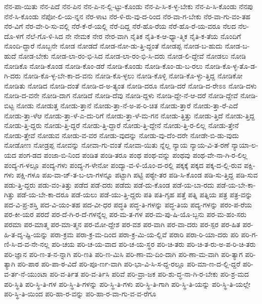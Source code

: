 {ನೆನ-ಪಾ-ಯಿತು
ನೆನ-ಪಿದೆ
ನೆನ-ಪಿನ
ನೆನ-ಪಿ-ನ-ಲ್ಲಿ-ಟ್ಟು-ಕೊಂಡು
ನೆನ-ಪಿ-ಸಿ-ಕ-ಳ್ಳ-ಬೇಕು
ನೆನ-ಪಿ-ಸಿ-ಕೊಂಡು
ನೆನಪು
ನೆನೆ-ಸಿ-ಕೊಂಡು
ನೆಪೋ-ಲಿ-ಯ-ನ್ನನ
ನೆರ-ಳಾಟ
ನೆರ-ಳಿ-ರು-ವು-ದ-ರಿಂದ
ನೆರ-ವಾ-ಗ-ಬೇಕು
ನೆರ-ವಾ-ಗು-ವಂ-ತಹ
ನೆರ-ವಿಗೆ
ನೆರ-ವೇ-ರಿ-ಸು-ವಲ್ಲಿ
ನೆರೆ-ಕೆ-ರೆ-ಯಲ್ಲಿ
ನೆರೆ-ದಿದ್ದ
ನೆರೆ-ಹೊ-ರೆಯ
ನೆರೆ-ಹೊ-ರೆ-ಯ-ವರೂ
ನೆಲದ
ನೆಲ-ದೊ-ಳಗೆ
ನೆಲೆ-ಗೊ-ಳಿ-ಸಿದ
ನೇ
ನೇಮಕ
ನೇರ
ನೇರ-ವಾಗಿ
ನೈತಿಕ
ನೈತಿ-ಕ-ಆ-ಧ್ಯಾ-ತ್ಮಿಕ
ನೈತಿ-ಕ-ತೆಯ
ನೊಂದಿಗೆ
ನೊಂದಿ-ದ್ದಾರೆ
ನೊಬ್ಬನೇ
ನೋಡ
ನೋಡದೆ
ನೋಡ-ನೋ-ಡು-ತ್ತಿ-ದ್ದಂತೆ
ನೋಡಪ್ಪ
ನೋಡ-ಬ-ಹುದು
ನೋಡ-ಬ-ಹುದೆ
ನೋಡ-ಬೇಕು
ನೋಡ-ಲಾ-ರಂ-ಭಿ-ಸಿದ
ನೋಡ-ಲಾ-ರಂ-ಭಿ-ಸಿ-ದರು
ನೋಡ-ಲಿ-ದ್ದೇವೆ
ನೋಡಲು
ನೋಡಿ
ನೋಡಿಕೊ
ನೋಡಿ-ಕೊಂಡ
ನೋಡಿ-ಕೊಂ-ಡರೆ
ನೋಡಿ-ಕೊಂಡು
ನೋಡಿ-ಕೊಂ-ಡು-ಬ-ರಲು
ನೋಡಿ-ಕೊ-ಳ್ಳ-ತೊ-ಡ-ಗಿ-ದರು
ನೋಡಿ-ಕೊ-ಳ್ಳ-ಬೇ-ಕಾ-ದ-ವನು
ನೋಡಿ-ಕೊ-ಳ್ಳಲು
ನೋಡಿ-ಕೊಳ್ಳಿ
ನೋಡಿ-ಕೊ-ಳ್ಳು-ತ್ತಿದ್ದ
ನೋಡಿಕೋ
ನೋಡಿತು
ನೋಡಿದ
ನೋಡಿ-ದಂತೆ
ನೋಡಿ-ದ-ಅ-ತ್ಯಂತ
ನೋಡಿ-ದರೂ
ನೋಡಿ-ದರೆ
ನೋಡಿ-ದ-ರೇಽಽ
ನೋಡಿ-ದಳು
ನೋಡಿ-ದ-ವನೇ
ನೋಡಿ-ದಾಗ
ನೋಡಿದೆ
ನೋಡಿ-ದೆವು
ನೋಡಿ-ದ್ದಳು
ನೋಡಿ-ದ್ದೇ-ನೆ-ಆ-ದರೆ
ನೋಡಿ-ದ್ದೇವೆ
ನೋಡಿ-ಬಿಟ್ಟ
ನೋಡು
ನೋಡುತ್ತ
ನೋಡು-ತ್ತಾನೆ
ನೋಡು-ತ್ತಾ-ನೆ-ಅ-ಪ-ರಿ-ಚಿತ
ನೋಡು-ತ್ತಾರೆ
ನೋಡು-ತ್ತಾ-ರೆ-ಎದೆ
ನೋಡು-ತ್ತಾ-ಳೆಆ
ನೋಡು-ತ್ತಾ-ಳೆ-ಎ-ದು-ರಿಗೆ
ನೋಡು-ತ್ತಾ-ಳೆ-ಮ-ಗನ
ನೋಡು-ತ್ತಿತ್ತು
ನೋಡು-ತ್ತಿದೆ
ನೋಡು-ತ್ತಿದ್ದ
ನೋಡು-ತ್ತಿ-ದ್ದರು
ನೋಡು-ತ್ತಿ-ದ್ದರೆ
ನೋಡು-ತ್ತಿ-ದ್ದಾರೆ
ನೋಡು-ತ್ತಿ-ದ್ದೇನೆ
ನೋಡು-ತ್ತಿ-ರ-ಲಿಲ್ಲ
ನೋಡು-ತ್ತೇನೆ
ನೋಡು-ತ್ತೇವೆ
ನೋಡುವ
ನೋಡು-ವ-ವರ
ನೋಡು-ವುದನ್ನು
ನೋಡು-ವು-ದೆಂ-ದರೇ
ನೋಡೇ-ಬಿ-ಡು-ವುದು
ನೋಡೋಣ
ನೋಡ್ರಪ್ಪ
ನೋವನ್ನು
ನೋವಾ-ಗು-ವಂತೆ
ನೋವಾ-ಯಿತು
ನ್ನೆಲ್ಲ
ನ್ಯಾಯ
ನ್ಯಾಯ-ವಿ-ತ-ರಣೆ
ನ್ಯಾಯಾ-ಲ-ಯದ
ಪಂಗ-ಡದ
ಪಂಜಾ-ಬಿ-ನಿಂದ
ಪಂಡಿತ
ಪಂಡಿ-ತರೂ
ಪಂಥ
ಪಂಥ-ವನ್ನು
ಪಂಥವು
ಪಂಥ-ವೇ-ನಾ-ಗಿ-ರ-ಲಿಲ್ಲ
ಪಂದ್ಯ-ಗ-ಳಲ್ಲೂ
ಪಂದ್ಯ-ಗಳು
ಪಂದ್ಯ-ಗ-ಳೇನೋ
ಪಂದ್ಯಾ-ವ-ಳಿ-ಯೊಂ-ದ-ರಲ್ಲಿ
ಪಕ್ಕಕ್ಕೆ
ಪಕ್ಕದ
ಪಕ್ಕ-ದ-ಲ್ಲಿ-ರುವ
ಪಕ್ಷಿ-ಗಳು
ಪಕ್ಷಿ-ಗಳೂ
ಪಖ-ವಾ-ಜ್-ತ-ಬ-ಲಾ-ಗಳನ್ನೂ
ಪಟ್ಟಾಗಿ
ಪಟ್ಟಿ
ಪಠ್ಯೇ-ತರ
ಪಡಿ-ಸಿ-ಕೊಂಡ
ಪಡಿ-ಸು-ತ್ತಿದ್ದ
ಪಡಿ-ಸುವ
ಪಡು-ತ್ತಿ-ದ್ದರು
ಪಡು-ವಂ-ತಿತ್ತು
ಪಡೆದ
ಪಡೆ-ದರು
ಪಡೆದು
ಪಡೆ-ದು-ಕೊಂಡ
ಪಡೆ-ಯ-ಬಾ-ರದು
ಪಡೆ-ಯ-ಬೇ-ಕಾ-ಗಿತ್ತು
ಪಡೆ-ಯ-ಬೇ-ಕಾ-ದರೂ
ಪಡೆ-ಯಲು
ಪಡೆ-ಯು-ತ್ತಿ-ದ್ದರು
ಪತಿ
ಪತಿ-ಗೃಹ
ಪತ್ತೆ
ಪತ್ನಿ
ಪತ್ನಿಯ
ಪತ್ರ
ಪತ್ರ-ವನ್ನು
ಪದ-ವಿ-ಪ್ರ-ಶಸ್ತಿ
ಪದ-ವಿ-ಯಂ-ತಹ
ಪದ-ವೀ-ಧರ
ಪದ್ಧತಿ
ಪದ್ಧ-ತಿ-ಗಳನ್ನು
ಪದ್ಧ-ತಿಯ
ಪದ್ಯ-ಗಳನ್ನು
ಪರಂ-ಪ-ರೆಯ
ಪರ-ಕೀ-ಯರ
ಪರದೆ
ಪರ-ದೆ-ಗಿ-ರ-ದೆ-ಗಳನ್ನೆಲ್ಲ
ಪರ-ಮ-ತ-ಗಳ
ಪರ-ಮ-ಪು-ಷಿ-ಯೊ-ಬ್ಬನು
ಪರ-ಮ-ಹಂ-ಸರು
ಪರಮಾ
ಪರ-ಮಾತ್ಮ
ಪರ-ಮಾ-ತ್ಮನ
ಪರ-ಮೋ-ದ್ದೇಶ
ಪರ-ವಶ
ಪರ-ವಾಗಿ
ಪರ-ವಾ-ದರು
ಪರ-ಸ್ಪರ
ಪರ-ಹಿತ
ಪರ-ಹಿ-ತ-ದೃ-ಷ್ಟಿ-ಯನ್ನು
ಪರಾ-ಕ್ರಮ
ಪರಾ-ಕ್ರ-ಮ-ದಿಂದ
ಪರಾ-ಕ್ರ-ಮಿ-ಯ-ಲ್ಲಿವೆ
ಪರಾರಿ
ಪರಾ-ರಿ-ಯಾ-ದರು
ಪರಿ
ಪರಿ-ಗ-ಣಿ-ಸಿ-ದ-ವ-ನೇ-ನಲ್ಲ
ಪರಿ-ಚಯ
ಪರಿ-ಚ-ಯ-ವಾದ
ಪರಿ-ಚ-ಯ-ಸ್ಥರ
ಪರಿ-ಚಿ-ತರು
ಪರಿ-ಚಿ-ತ-ರು-ಅ-ಪ-ರಿ-ಚಿ-ತರು
ಪರಿ-ಜ್ಞಾನ
ಪರಿ-ಣ-ತ-ನ-ನ್ನಾಗಿ
ಪರಿ-ಣತಿ
ಪರಿ-ಣ-ಮಿಸಿ
ಪರಿ-ಣಾ-ಮ-ದಿಂ-ದಾಗಿ
ಪರಿ-ಣಾ-ಮ-ವಾಗಿ
ಪರಿ-ತ್ಯಾಗ
ಪರಿ-ತ್ಯಾಗಿ
ಪರಿ-ಪಾಠ
ಪರಿ-ಪಾ-ಠ-ವಿದೆ
ಪರಿ-ಪೂ-ರ್ಣ-ವಾಗಿ
ಪರಿ-ಭಾ-ವಿ-ಸಿ-ಸ-ದ್ದ-ರಲ್ಲೂ
ಪರಿ-ಮಾ-ಣ-ದ-ಲ್ಲಿ-ದ್ದರೆ
ಪರಿ-ವ-ರ್ತ-ನೆ-ಯುಂಟಾ
ಪರಿ-ವ-ರ್ತಿತ
ಪರಿ-ವ-ರ್ತಿಸಿ
ಪರಿವೆ
ಪರಿ-ವ್ರಾ-ಜಕ
ಪರಿ-ಶು-ದ್ಧ-ನಾ-ಗಿ-ರ-ಬೇಕು
ಪರಿ-ಶ್ರ-ಮದ
ಪರಿ-ಸ್ಥಿತಿ
ಪರಿ-ಸ್ಥಿ-ತಿ-ಗಳ
ಪರಿ-ಸ್ಥಿ-ತಿ-ಗಳನ್ನು
ಪರಿ-ಸ್ಥಿ-ತಿ-ಗಳು
ಪರಿ-ಸ್ಥಿ-ತಿ-ಗಾಗಿ
ಪರಿ-ಸ್ಥಿ-ತಿ-ಯನ್ನು
ಪರಿ-ಸ್ಥಿ-ತಿ-ಯಲ್ಲೇ
ಪರಿ-ಸ್ಥಿ-ತಿ-ಯಿಂದ
ಪರಿ-ಹಾ-ರ-ವನ್ನು
ಪರಿ-ಹಾ-ರ-ವಾ-ಗು-ವ-ವ-ರೆಗೂ
}
